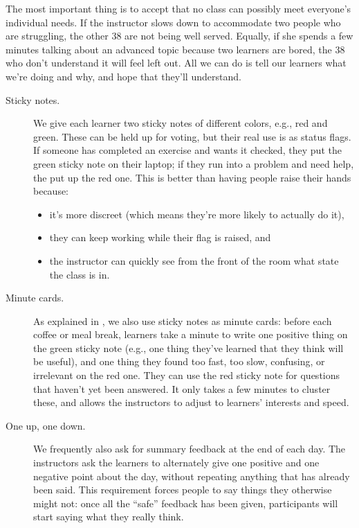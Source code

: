 The most important thing is to accept that no class can possibly meet
everyone's individual needs. If the instructor slows down to accommodate
two people who are struggling, the other 38 are not being well served.
Equally, if she spends a few minutes talking about an advanced topic
because two learners are bored, the 38 who don't understand it will feel
left out. All we can do is tell our learners what we're doing and why,
and hope that they'll understand.


\begin{description}
\item[Sticky notes.]
We give each learner two sticky notes of different colors, e.g., red and
green. These can be held up for voting, but their real use is as status
flags. If someone has completed an exercise and wants it checked, they
put the green sticky note on their laptop; if they run into a problem
and need help, the put up the red one. This is better than having people
raise their hands because:

\begin{itemize}
\item
  it's more discreet (which means they're more likely to actually do
  it),
\item
  they can keep working while their flag is raised, and
\item
  the instructor can quickly see from the front of the room what state
  the class is in.
\end{itemize}
\item[Minute cards.]
As explained in ,
we also use sticky notes as minute cards: before each coffee or meal
break, learners take a minute to write one positive thing on the green
sticky note (e.g., one thing they've learned that they think will be
useful), and one thing they found too fast, too slow, confusing, or
irrelevant on the red one. They can use the red sticky note for
questions that haven't yet been answered. It only takes a few minutes to
cluster these, and allows the instructors to adjust to learners'
interests and speed.
\item[One up, one down.]
We frequently also ask for summary feedback at the end of each day. The
instructors ask the learners to alternately give one positive and one
negative point about the day, without repeating anything that has
already been said. This requirement forces people to say things they
otherwise might not: once all the ``safe'' feedback has been given,
participants will start saying what they really think.


\end{description}
